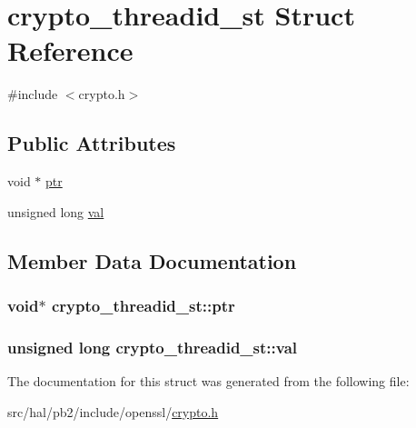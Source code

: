 \hypertarget{structcrypto__threadid__st}{}\section{crypto\+\_\+threadid\+\_\+st Struct Reference}
\label{structcrypto__threadid__st}


{\ttfamily \#include $<$crypto.\+h$>$}

\subsection*{Public Attributes}
\begin{DoxyCompactItemize}
\item 
void $\ast$ \hyperlink{structcrypto__threadid__st_a682e95abcf3ddb87da11e9d64dc04e71}{ptr}
\item 
unsigned long \hyperlink{structcrypto__threadid__st_ae211eb79aaff1a57eba548fb6fda0e2a}{val}
\end{DoxyCompactItemize}


\subsection{Member Data Documentation}
\subsubsection[{\texorpdfstring{ptr}{ptr}}]{\setlength{\rightskip}{0pt plus 5cm}void$\ast$ crypto\+\_\+threadid\+\_\+st\+::ptr}\hypertarget{structcrypto__threadid__st_a682e95abcf3ddb87da11e9d64dc04e71}{}\label{structcrypto__threadid__st_a682e95abcf3ddb87da11e9d64dc04e71}
\subsubsection[{\texorpdfstring{val}{val}}]{\setlength{\rightskip}{0pt plus 5cm}unsigned long crypto\+\_\+threadid\+\_\+st\+::val}\hypertarget{structcrypto__threadid__st_ae211eb79aaff1a57eba548fb6fda0e2a}{}\label{structcrypto__threadid__st_ae211eb79aaff1a57eba548fb6fda0e2a}


The documentation for this struct was generated from the following file\+:\begin{DoxyCompactItemize}
\item 
src/hal/pb2/include/openssl/\hyperlink{crypto_8h}{crypto.\+h}\end{DoxyCompactItemize}

